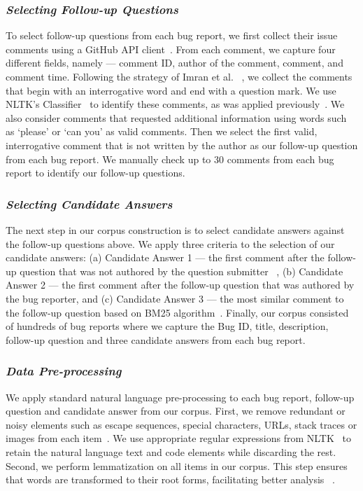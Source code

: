 \subsubsection{\textit{Selecting Follow-up Questions}}
\label{sec:proposedtechnique-followq}
To select follow-up questions from each bug report, we first collect their issue comments using a GitHub API client~\cite{koshukeGitHubLibrary}. From each comment, we capture four different fields, namely --- comment ID, author of the comment, comment, and comment time. Following the strategy of Imran et al. ~\cite{imran2021automatically}, we collect the comments that begin with an interrogative word and end with a question mark. We use NLTK's Classifier~\cite{nltkclassifydocumentation} to identify these comments, as was applied previously~\cite{yuan2012enhancing}. We also consider comments that requested additional information using words such as ‘please’ or `can you' as valid comments. Then we select the first valid, interrogative comment that is not written by the author as our follow-up question from each bug report. We manually check up to 30 comments from each bug report to identify our follow-up questions. \par

\subsubsection{\textit{Selecting Candidate Answers}}
\label{sec:proposedtechnique-candidateans}
The next step in our corpus construction is to select candidate answers against the follow-up questions above. 
We apply three criteria to the selection of our candidate answers: (a) Candidate Answer 1 --- the first comment after the follow-up question that was not authored by the question submitter ~\cite{imran2021automatically}, (b) Candidate Answer 2 --- the first comment after the follow-up question that was authored by the bug reporter, and (c) Candidate Answer 3 --- the most similar comment to the follow-up question based on BM25 algorithm~\cite{whissell2011improving}. Finally, our corpus consisted of hundreds of bug reports where we capture the Bug ID, title, description, follow-up question and three candidate answers from each bug report.\par

\subsubsection{\textit{Data Pre-processing}}
\label{sec:proposedtechnique-datapreprocessing}
We apply standard natural language pre-processing to each bug report, follow-up question and candidate answer from our corpus. First, we remove redundant or noisy elements such as escape sequences, special characters, URLs, stack traces or images from each item~\cite{imran2021automatically}. We use appropriate regular expressions from  NLTK~\cite{NLTK}
to retain the natural language text and code elements while discarding the rest. Second, we perform lemmatization on all items in our corpus. This step ensures that words are transformed to their root forms, facilitating better analysis ~\cite{pramana2022systematic}.\par

